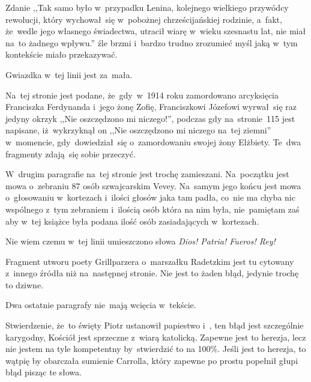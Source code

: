\documentclass[a4paper,11pt]{article}
\begin{document}
\start {} Zdanie ,,Tak samo było w~przypadku Lenina,
kolejnego wielkiego przywódcy rewolucji, który wychował~się w~pobożnej
chrześcijańskiej rodzinie, a~fakt, że~wedle jego własnego świadectwa,
utracił wiarę w~wieku szesnastu lat, nie miał na~to żadnego wpływu.''
źle brzmi i~bardzo trudno zrozumieć myśl jaką w~tym kontekście miało
przekazywać.

\vspace{\spaceFour}


\start {} Gwiazdka w~tej linii jest za~mała.

\vspace{\spaceFour}


\start {} Na~tej stronie jest podane, że~gdy~w~1914 roku
zamordowano arcyksięcia Franciszka Ferdynanda i~jego żonę Zofię,
Franciszkowi Józefowi wyrwał~się raz jedyny okrzyk ,,Nie oszczędzono
mi niczego!'', podczas gdy na~stronie~115 jest napisane, iż~wykrzyknął
on ,,Nie oszczędzono mi niczego na~tej ziemni'' w~momencie,
gdy~dowiedział~się o~zamordowaniu swojej żony Elżbiety. Te~dwa
fragmenty zdają~się sobie przeczyć.

\vspace{\spaceFour}


\start {} W~drugim paragrafie na~tej stronie jest trochę
zamieszani. Na~początku jest mowa o~zebraniu 87 osób szwajcarskim
Vevey. Na~samym jego końcu jest mowa o~głosowaniu w~kortezach i~ilości
głosów jaka tam padła, co~nie ma chyba nic wspólnego z~tym zebraniem
i~ilością osób która na nim była, nie~pamiętam zaś aby w~tej książce
była podana ilość osób zasiadających w~kortezach.

\vspace{\spaceFour}


\start {} Nie wiem czemu w~tej linii umieszczono słowa
\emph{Dios! Patria! Fueros! Rey!}

\vspace{\spaceFour}


\start {} Fragment utworu poety Grillparzera o~marszałku
Radetzkim jest tu cytowany z~innego źródła niż na~następnej stronie.
Nie jest to żaden błąd, jedynie trochę to dziwne.

\vspace{\spaceFour}


\start {} Dwa ostatnie paragrafy nie~mają wcięcia w~tekście.

\vspace{\spaceFour}


\start {} Stwierdzenie, że~to święty Piotr ustanowił papiestwo
i~, ten błąd jest szczególnie karygodny, Kościół jest sprzeczne
z~wiarą katolicką. Zapewne jest to herezja, lecz nie jestem na tyle
kompetentny by~stwierdzić to na 100\%. Jeśli jest to herezja, to
wątpię by obarczała sumienie Carrolla, który zapewne po prostu
popełnił głupi błąd pisząc te słowa.
\end{document}
